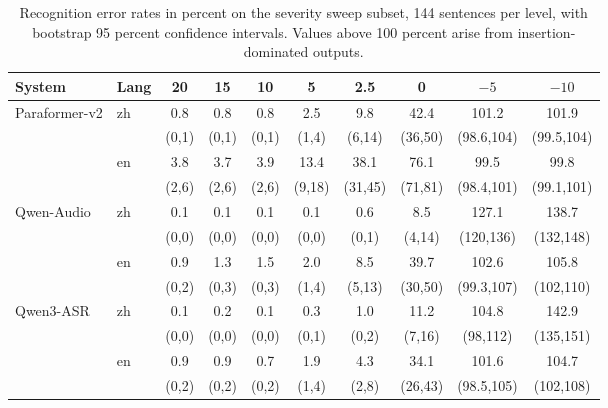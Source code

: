\documentclass[11pt]{article}
\begin{document}
\begin{table}[h]
\centering
\caption{Recognition error rates in percent on the severity sweep subset,
144 sentences per level, with bootstrap 95 percent confidence intervals.
Values above 100 percent arise from insertion-dominated outputs.}
\label{tab:sweep}
\footnotesize
\setlength{\tabcolsep}{1.9pt}
\begin{tabular}{llcccccccc}
\toprule
System & Lang & 20 & 15 & 10 & 5 & 2.5 & 0 & $-5$ & $-10$ \\
\midrule
Paraformer-v2 & zh & 0.8 & 0.8 & 0.8 & 2.5 & 9.8 & 42.4 & 101.2 & 101.9 \\
 &  & (0,1) & (0,1) & (0,1) & (1,4) & (6,14) & (36,50) & (98.6,104) & (99.5,104) \\
 & en & 3.8 & 3.7 & 3.9 & 13.4 & 38.1 & 76.1 & 99.5 & 99.8 \\
 &  & (2,6) & (2,6) & (2,6) & (9,18) & (31,45) & (71,81) & (98.4,101) & (99.1,101) \\
Qwen-Audio & zh & 0.1 & 0.1 & 0.1 & 0.1 & 0.6 & 8.5 & 127.1 & 138.7 \\
 &  & (0,0) & (0,0) & (0,0) & (0,0) & (0,1) & (4,14) & (120,136) & (132,148) \\
 & en & 0.9 & 1.3 & 1.5 & 2.0 & 8.5 & 39.7 & 102.6 & 105.8 \\
 &  & (0,2) & (0,3) & (0,3) & (1,4) & (5,13) & (30,50) & (99.3,107) & (102,110) \\
Qwen3-ASR & zh & 0.1 & 0.2 & 0.1 & 0.3 & 1.0 & 11.2 & 104.8 & 142.9 \\
 &  & (0,0) & (0,0) & (0,0) & (0,1) & (0,2) & (7,16) & (98,112) & (135,151) \\
 & en & 0.9 & 0.9 & 0.7 & 1.9 & 4.3 & 34.1 & 101.6 & 104.7 \\
 &  & (0,2) & (0,2) & (0,2) & (1,4) & (2,8) & (26,43) & (98.5,105) & (102,108) \\
\bottomrule
\end{tabular}
\end{table}
\end{document}
